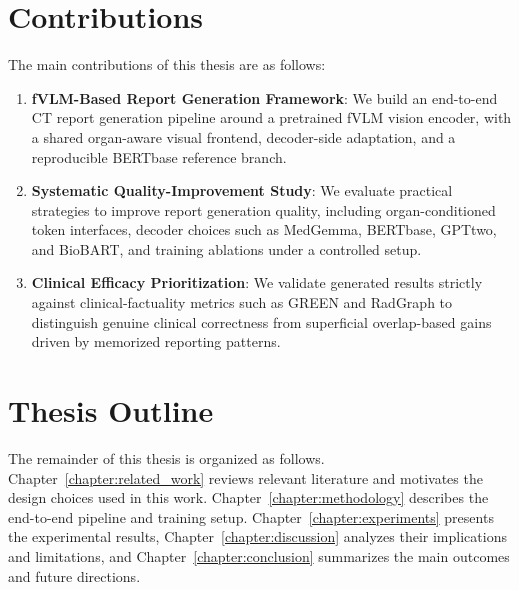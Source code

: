 \section{Contributions}
The main contributions of this thesis are as follows:
\begin{enumerate}
    \item \textbf{fVLM-Based Report Generation Framework}: We build an end-to-end \ac{CT} report generation pipeline around a pretrained fVLM vision encoder, with a shared organ-aware visual frontend, decoder-side adaptation, and a reproducible \ac{BERTbase} reference branch.
    \item \textbf{Systematic Quality-Improvement Study}: We evaluate practical strategies to improve report generation quality, including organ-conditioned token interfaces, decoder choices such as MedGemma, \ac{BERTbase}, \ac{GPTtwo}, and BioBART, and training ablations under a controlled setup.
    \item \textbf{Clinical Efficacy Prioritization}: We validate generated results strictly against clinical-factuality metrics such as \ac{GREEN} and \ac{RadGraph} to distinguish genuine clinical correctness from superficial overlap-based gains driven by memorized reporting patterns.
\end{enumerate}

\section{Thesis Outline}
The remainder of this thesis is organized as follows. Chapter~\ref{chapter:related_work} reviews relevant literature and motivates the design choices used in this work. Chapter~\ref{chapter:methodology} describes the end-to-end pipeline and training setup. Chapter~\ref{chapter:experiments} presents the experimental results, Chapter~\ref{chapter:discussion} analyzes their implications and limitations, and Chapter~\ref{chapter:conclusion} summarizes the main outcomes and future directions.
